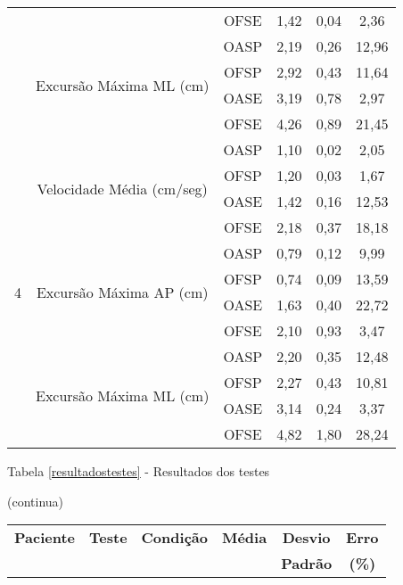 \begin{apendicesenv}
\begin{table}[ht]
\begin{tabular}{|c|c|c|c|c|c|}
 &  & OFSE & 1,42 & 0,04 & 2,36 \\ \cline{2-6} 
 & \multirow{4}{*}{Excursão Máxima ML (cm)} & OASP & 2,19 & 0,26 & 12,96 \\ \cline{3-6} 
 &  & OFSP & 2,92 & 0,43 & 11,64 \\ \cline{3-6} 
 &  & OASE & 3,19 & 0,78 & 2,97 \\ \cline{3-6} 
 &  & OFSE & 4,26 & 0,89 & 21,45 \\ \hline
\multirow{12}{*}{4} & \multirow{4}{*}{Velocidade Média (cm/seg)} & OASP & 1,10 & 0,02 & 2,05 \\ \cline{3-6} 
 &  & OFSP & 1,20 & 0,03 & 1,67 \\ \cline{3-6} 
 &  & OASE & 1,42 & 0,16 & 12,53 \\ \cline{3-6} 
 &  & OFSE & 2,18 & 0,37 & 18,18 \\ \cline{2-6} 
 & \multirow{4}{*}{Excursão Máxima AP (cm)} & OASP & 0,79 & 0,12 & 9,99 \\ \cline{3-6} 
 &  & OFSP & 0,74 & 0,09 & 13,59 \\ \cline{3-6} 
 &  & OASE & 1,63 & 0,40 & 22,72 \\ \cline{3-6} 
 &  & OFSE & 2,10 & 0,93 & 3,47 \\ \cline{2-6} 
 & \multirow{4}{*}{Excursão Máxima ML (cm)} & OASP & 2,20 & 0,35 & 12,48 \\ \cline{3-6} 
 &  & OFSP & 2,27 & 0,43 & 10,81 \\ \cline{3-6} 
 &  & OASE & 3,14 & 0,24 & 3,37 \\ \cline{3-6} 
 &  & OFSE & 4,82 & 1,80 & 28,24 \\ \hline

\end{tabular}
\end{table}
\pagebreak


\begin{table}[ht]
\begin{flushleft}
Tabela \ref{resultadostestes} - Resultados dos testes
\begin{flushright}
(continua)
\end{flushright}
\end{flushleft}
\begin{tabular}{|c|c|c|c|c|c|}
\hline
\textbf{Paciente}   & \textbf{Teste}                             & \textbf{Condição} & \textbf{Média} & \textbf{Desvio} & \textbf{Erro} \\
& & & & \textbf{Padrão} & \textbf{(\%)} \\ \hline


\end{tabular}
\end{table}
\end{apendicesenv}
